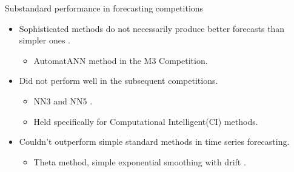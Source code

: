 \documentclass{beamer}
\begin{document}
    
    
     
	\begin{frame}{Substandard performance in forecasting competitions}
	\begin{itemize}
	\item Sophisticated methods do not necessarily produce better forecasts than simpler ones {\cite{Makridakis2000-ih}}.
	\vspace{1.5mm}
	\begin{itemize}\color{blue}
	\item AutomatANN method in the M3 Competition.
	\end{itemize}	
	\vspace{2.0mm}
	\item Did not perform well in the subsequent competitions.
	\vspace{1.5mm}
	\begin{itemize}\color{blue}
	\item NN3 and NN5 \cite{Crone2011-vv,Crone2008-ye}.
	\item Held specifically for Computational Intelligent(CI) methods.
	\end{itemize}
	\vspace{2.0mm}
	\item Couldn't outperform simple standard methods in time series forecasting.
	\vspace{1.5mm}
	\begin{itemize}\color{blue}
	\item Theta method, simple exponential smoothing with drift \cite{Hyndman2003-kc}.
	\end{itemize}
	\end{itemize}
	\end{frame}
%   
   
\end{document}
